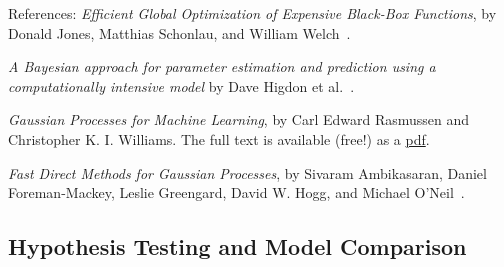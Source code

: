 References:
\bi
 \I 
  \textit{Efficient Global Optimization of Expensive Black-Box Functions},
     by Donald Jones, Matthias Schonlau, and William Welch~\cite{Jones:1998:EGO:596070.596218}.

 \I
  \textit{A Bayesian approach for parameter estimation and prediction using a computationally
   intensive model} by Dave Higdon et al.~\cite{Higdon:2014tva}.

 \I
   \textit{Gaussian Processes for Machine Learning}, by Carl Edward Rasmussen 
          and Christopher K. I. Williams.  The full text is available (free!) as a
          \href{http://www.gaussianprocess.org/gpml/chapters/RW.pdf}{pdf}.

 \I
   \textit{Fast Direct Methods for Gaussian Processes}, by 
            Sivaram Ambikasaran, Daniel Foreman-Mackey, Leslie Greengard, David W. Hogg, 
            and Michael O'Neil~\cite{2014arXiv1403.6015A}.            

\ei   



\subsection{Hypothesis Testing and Model Comparison} \label{subsec:model_comparison_lit}





